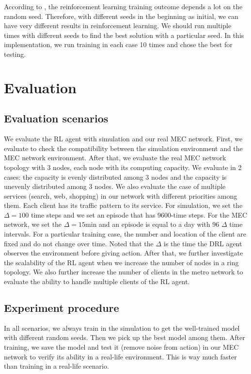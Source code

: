 \documentclass[conference]{IEEEtran}
\begin{document}
According to \cite{rlblogpost}, the reinforcement learning training outcome depends a lot on the random seed. Therefore, with different seeds in the beginning as initial, we can have very different results in reinforcement learning. We should run multiple times with different seeds to find the best solution with a particular seed. In this implementation, we run training in each case 10 times and chose the best for testing. 

\section{Evaluation}
\label{sec:Evaluation}
\subsection{Evaluation scenarios}
We evaluate the RL agent with simulation and our real MEC network. First, we evaluate to check the compatibility between the simulation environment and the MEC network environment. After that, we evaluate the real MEC network topology with 3 nodes, each node with its computing capacity. We evaluate in 2 cases: the capacity is evenly distributed among 3 nodes and the capacity is unevenly distributed among 3 nodes. We also evaluate the case of multiple services (search, web, shopping) in our network with different priorities among them. Each client has its traffic pattern to its service. For simulation, we set the $\Delta = 100$ time steps and we set an episode that has 9600-time steps. For the MEC network, we set the $\Delta = 15$min and an episode is equal to a day with 96 $\Delta$ time intervals. For a particular training case, the number and location of the client are fixed and do not change over time. Noted that the $\Delta$ is the time the DRL agent observes the environment before giving action. After that, we further investigate the scalability of the RL agent when we increase the number of nodes in a ring topology. We also further increase the number of clients in the metro network to evaluate the ability to handle multiple clients of the RL agent. 

\subsection{Experiment procedure}
In all scenarios, we always train in the simulation to get the well-trained model with different random seeds. Then we pick up the best model among them. After training, we save the model and test it (remove noise from action) in our MEC network to verify its ability in a real-life environment. This is way much faster than training in a real-life scenario. 
\end{document}
